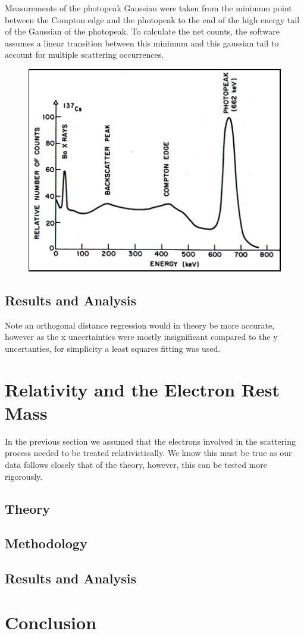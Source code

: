 \documentclass[%
reprint,
amsmath,amssymb,
aps,
]{revtex4-2}
\begin{document}
			Measurements of the photopeak Gaussian were taken from the minimum point between the Compton edge and the photopeak to the end of the high energy tail of the Gaussian of the photopeak. To calculate the net counts, the software assumes a linear transition between this minimum and this gaussian tail to account for multiple scattering occurrences.
			
			\begin{figure}
				\includegraphics[width=0.85\columnwidth]{gammaspectrum.jpg}
			\end{figure}
		
		\subsection{Results and Analysis}
			Note an orthogonal distance regression would in theory be more accurate, however as the x uncertainties were mostly insignificant compared to the y uncertanties, for simplicity a least squares fitting was used.
		
	\section{Relativity and the Electron Rest Mass}
		
		In the previous section we assumed that the electrons involved in the scattering process needed to be treated relativistically. We know this must be true as our data follows closely that of the theory, however, this can be tested more rigorously.		
		
		\subsection{Theory}
			
		
		\subsection{Methodology}
		
		\subsection{Results and Analysis}


	\section{Conclusion}

		
		
	\clearpage

		
\end{document}
